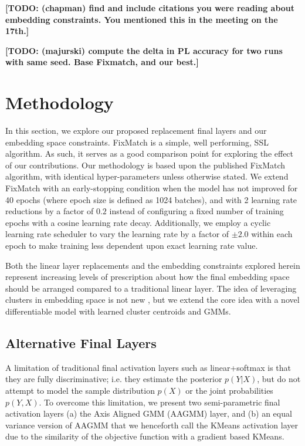 \documentclass[10pt,twocolumn,letterpaper]{article}
\newcommand{\TODO}[1]{\textbf{\color{red}[TODO: #1]}}
\begin{document}
\TODO {(chapman) find and include citations you were reading about embedding constraints. You mentioned this in the meeting on the 17th.}


\TODO {(majurski) compute the delta in PL accuracy for two runs with same seed. Base Fixmatch, and our best.}

\section{Methodology}

In this section, we explore our proposed replacement final layers and our embedding space constraints.
FixMatch \cite{sohn2020fixmatch} is a simple, well performing, SSL algorithm.
As such, it serves as a good comparison point for exploring the effect of our contributions.
Our methodology is based upon the published FixMatch \cite{sohn2020fixmatch} algorithm, with identical hyper-parameters unless otherwise stated.
We extend FixMatch with an early-stopping condition when the model has not improved for 40 epochs (where epoch size is defined as 1024 batches), and with 2 learning rate reductions by a factor of $0.2$ instead of configuring a fixed number of training epochs with a cosine learning rate decay.
Additionally, we employ a cyclic learning rate scheduler to vary the learning rate by a factor of $\pm2.0$ within each epoch to make training less dependent upon exact learning rate value.

Both the linear layer replacements and the embedding constraints explored herein represent increasing levels of prescription about how the final embedding space should be arranged compared to a traditional linear layer.
The idea of leveraging clusters in embedding space is not new \cite{caron2018deep,caron2020unsupervised,enguehard2019semi}, but we extend the core idea with a novel differentiable model with learned cluster centroids and GMMs.

\subsection{Alternative Final Layers}

A limitation of traditional final activation layers such as linear+softmax is that they are fully discriminative; i.e. they estimate the posterior $p(Y|X)$, but do not attempt to model the sample distribution $p(X)$ or the joint probabilities $p(Y,X)$. 
To overcome this limitation, we present two semi-parametric final activation layers (a) the Axis Aligned GMM (AAGMM) layer, and (b) an equal variance version of AAGMM that we henceforth call the KMeans activation layer due to the similarity of the objective function with a gradient based KMeans.
\end{document}
